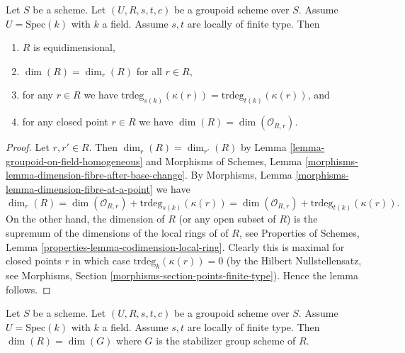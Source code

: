 \begin{lemma}
\label{lemma-groupoid-on-field-locally-finite-type-dimension}
Let $S$ be a scheme. Let $(U, R, s, t, c)$ be a groupoid scheme
over $S$. Assume $U = \text{Spec}(k)$ with $k$ a field.
Assume $s, t$ are locally of finite type.
Then
\begin{enumerate}
\item $R$ is equidimensional,
\item $\dim(R) = \dim_r(R)$ for all $r \in R$,
\item for any $r \in R$ we have
$\text{trdeg}_{s(k)}(\kappa(r)) = \text{trdeg}_{t(k)}(\kappa(r))$, and
\item for any closed point $r \in R$ we have
$\dim(R) = \dim(\mathcal{O}_{R, r})$.
\end{enumerate}
\end{lemma}

\begin{proof}
Let $r, r' \in R$.
Then $\dim_r(R) = \dim_{r'}(R)$ by
Lemma \ref{lemma-groupoid-on-field-homogeneous}
and
Morphisms of Schemes,
Lemma \ref{morphisms-lemma-dimension-fibre-after-base-change}.
By
Morphisms, Lemma \ref{morphisms-lemma-dimension-fibre-at-a-point}
we have
$$
\dim_r(R) =
\dim(\mathcal{O}_{R, r}) + \text{trdeg}_{s(k)}(\kappa(r)) =
\dim(\mathcal{O}_{R, r}) + \text{trdeg}_{t(k)}(\kappa(r)).
$$
On the other hand, the dimension of $R$ (or any open subset of $R$)
is the supremum of the dimensions of the local rings of of $R$, see
Properties of Schemes, Lemma \ref{properties-lemma-codimension-local-ring}.
Clearly this is maximal for closed points $r$ in which case
$\text{trdeg}_{k}(\kappa(r)) = 0$ (by the Hilbert Nullstellensatz, see
Morphisms, Section \ref{morphisms-section-points-finite-type}).
Hence the lemma follows.
\end{proof}

\begin{lemma}
\label{lemma-groupoid-on-field-dimension-equal-stabilizer}
Let $S$ be a scheme. Let $(U, R, s, t, c)$ be a groupoid scheme
over $S$. Assume $U = \text{Spec}(k)$ with $k$ a field.
Assume $s, t$ are locally of finite type.
Then $\dim(R) = \dim(G)$ where $G$ is the stabilizer group scheme of $R$.
\end{lemma}

